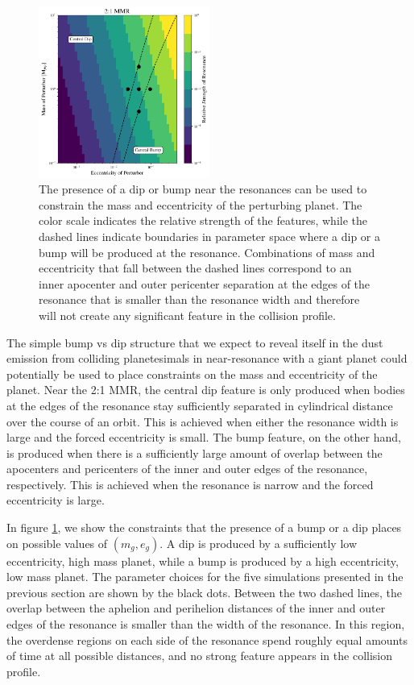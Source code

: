 \documentclass[twocolumn]{aastex63}
\begin{document}
\begin{figure}
\begin{center}
    \includegraphics[width=0.5\textwidth]{figures/bump_dip_diag.png}
    \caption{The presence of a dip or bump near the resonances can be used to constrain the mass and eccentricity
    of the perturbing planet. The color scale indicates the relative strength of the features, while the dashed lines
    indicate boundaries in parameter space where a dip or a bump will be produced at the resonance. Combinations of mass and eccentricity that fall 
    between the dashed lines correspond to an inner apocenter and outer pericenter separation at the edges of the resonance that is smaller than the 
    resonance width and therefore will not create any significant feature in the collision profile.\label{fig:bump_dip_diag}}
\end{center}
\end{figure}

The simple bump vs dip structure that we expect to reveal itself in the dust emission from colliding planetesimals in near-resonance with a giant 
planet could potentially be used to place constraints on the mass and eccentricity of the planet. Near the 2:1 MMR, the central dip feature is only 
produced when bodies at the edges of the resonance stay sufficiently separated in cylindrical distance over the course of an orbit. This is achieved 
when either the resonance width is large and the forced eccentricity is small. The bump feature, on the other hand, is produced when there is a 
sufficiently large amount of overlap between the apocenters and pericenters of the inner and outer edges of the resonance, respectively. This is 
achieved when the resonance is narrow and the forced eccentricity is large.

In figure \ref{fig:bump_dip_diag}, we show the constraints that the presence of a bump or a dip places on possible values of $(m_{g}, e_{g})$. A dip 
is produced by a sufficiently low eccentricity, high mass planet, while a bump is produced by a high eccentricity, low mass planet. The parameter 
choices for the five simulations presented in the previous section are shown by the black dots. Between the two dashed lines, the overlap between 
the aphelion and perihelion distances of the inner and outer edges of the resonance is smaller than the width of the resonance. In this region, the 
overdense regions on each side of the resonance spend roughly equal amounts of time at all possible distances, and no strong feature appears in 
the collision profile.
\end{document}
